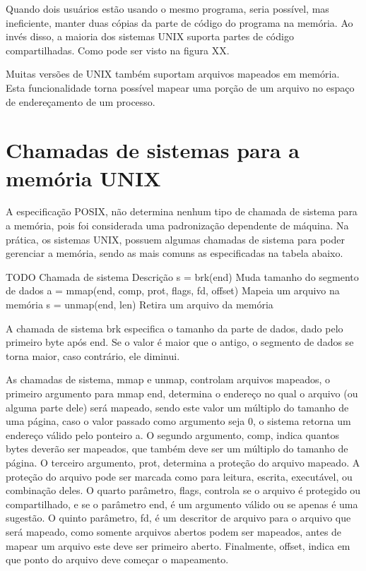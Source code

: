 Quando dois usuários estão usando o mesmo programa, seria possível, mas ineficiente, manter duas cópias da parte de código do programa na memória. Ao invés disso, a maioria dos sistemas UNIX suporta partes de código compartilhadas. Como pode ser visto na figura XX.

Muitas versões de UNIX também suportam arquivos mapeados em memória. Esta funcionalidade torna possível mapear uma porção de um arquivo no espaço de endereçamento de um processo.

\section{Chamadas de sistemas para a memória UNIX}

A especificação POSIX, não determina nenhum tipo de chamada de sistema para a memória, pois foi considerada uma padronização dependente de máquina. Na prática, os sistemas UNIX, possuem algumas chamadas de sistema para poder gerenciar a memória, sendo as mais comuns as especificadas na tabela abaixo.

TODO
Chamada de sistema
Descrição
s = brk(end)
Muda tamanho do segmento de dados
a = mmap(end, comp, prot, flags, fd, offset)
Mapeia um arquivo na memória
s = unmap(end, len)
Retira um arquivo da memória

A chamada de sistema brk especifica o tamanho da parte de dados, dado pelo primeiro byte após end. Se o valor é maior que o antigo, o segmento de dados se torna maior, caso contrário, ele diminui.

As chamadas de sistema, mmap e unmap, controlam arquivos mapeados, o primeiro argumento para mmap end, determina o endereço no qual o arquivo (ou alguma parte dele) será mapeado, sendo este valor um múltiplo do tamanho de uma página, caso o valor passado como argumento seja 0, o sistema retorna um endereço válido pelo ponteiro a. O segundo argumento, comp, indica quantos bytes deverão ser mapeados, que também deve ser um múltiplo do tamanho de página. O terceiro argumento, prot, determina a proteção do arquivo mapeado. A proteção do arquivo pode ser marcada como para leitura, escrita, executável, ou combinação deles. O quarto parâmetro, flags, controla se o arquivo é protegido ou compartilhado, e se o parâmetro end, é um argumento válido ou se apenas é uma sugestão. O quinto parâmetro, fd, é um descritor de arquivo para o arquivo que será mapeado, como somente arquivos abertos podem ser mapeados, antes de mapear um arquivo este deve ser primeiro aberto. Finalmente, offset, indica em que ponto do arquivo deve começar o mapeamento.

